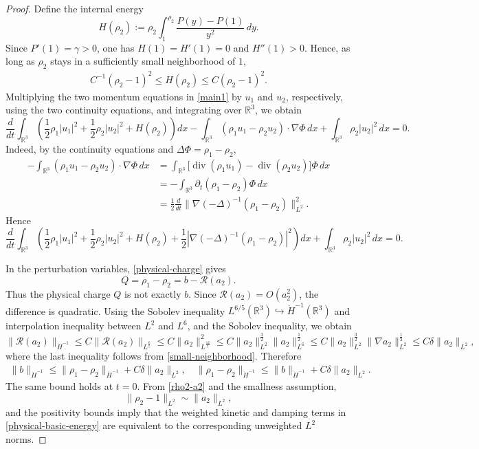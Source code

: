 \documentclass[10pt,reqno]{amsart}
\numberwithin{equation}{section}
\begin{document}
\begin{proof}
 Define the internal energy
\[%
H(\rho_2):=\rho_2\int_1^{\rho_2}\frac{P(y)-P(1)}{y^2}\,dy.
\]%
Since $P'(1)=\gamma>0$, one has $H(1)=H'(1)=0$ and $H''(1)>0$.  Hence, as long as $\rho_2$ stays in a sufficiently small neighborhood of $1$,
\begin{align}\label{H-equivalence}
C^{-1}(\rho_2-1)^2\le H(\rho_2)\le C(\rho_2-1)^2.
\end{align}
Multiplying the two momentum equations in \eqref{main1} by $u_1$ and $u_2$, respectively, using the two continuity equations, and integrating over $\mathbb R^3$, we obtain
\[
 \frac{d}{dt}\int_{\mathbb R^3}
\left(\frac12\rho_1|u_1|^2+\frac12\rho_2|u_2|^2+H(\rho_2)\right)dx -\int_{\mathbb R^3}(\rho_1u_1-\rho_2u_2)\cdot\nabla\Phi\,dx
+\int_{\mathbb R^3}\rho_2|u_2|^2\,dx=0.
\]
 Indeed, by the continuity equations and
$\Delta\Phi=\rho_1-\rho_2$,
\begin{align*}
-\int_{\mathbb R^3}(\rho_1u_1-\rho_2u_2)\cdot\nabla\Phi\,dx
&=\int_{\mathbb R^3}\big[\operatorname{div}(\rho_1u_1)-\operatorname{div}(\rho_2u_2)\big]\Phi\,dx\\
&=-\int_{\mathbb R^3}\partial_t(\rho_1-\rho_2)\Phi\,dx\\
&=\frac12\frac{d}{dt}
\|\nabla(-\Delta)^{-1}(\rho_1-\rho_2)\|_{L^2}^2.
\end{align*}
Hence
\begin{equation}\label{physical-basic-energy}
 \frac{d}{dt}\int_{\mathbb R^3}\left(
\frac12\rho_1|u_1|^2+\frac12\rho_2|u_2|^2+H(\rho_2)
+\frac12|\nabla(-\Delta)^{-1}(\rho_1-\rho_2)|^2\right)dx +\int_{\mathbb R^3}\rho_2|u_2|^2\,dx=0.
\end{equation}

In the perturbation variables, \eqref{physical-charge} gives
\[
Q=\rho_1-\rho_2=b-\mathcal R(a_2).
\]
Thus the physical charge $Q$ is not exactly $b$.  Since $\mathcal R(a_2)=O(a_2^2)$, the difference is quadratic.  Using the Sobolev inequality
$L^{6/5}(\mathbb R^3)\hookrightarrow\dot H^{-1}(\mathbb R^3)$ and interpolation inequality between $L^2$ and $L^6$, and the Sobolev
inequality, we obtain
\[ 
\|\mathcal R(a_2)\|_{\dot H^{-1}}
\le C\|\mathcal R(a_2)\|_{L^{\frac{6}{5}}} \le C\|a_2\|_{L^{\frac{12}{5}}}^2 \le C\|a_2\|_{L^2}^{\frac{3}{2}}\|a_2\|_{L^6}^{\frac{1}{2}}
\le C\|a_2\|_{L^2}^{\frac{3}{2}}\|\nabla a_2\|_{L^2}^{\frac{1}{2}}
\le C\delta\|a_2\|_{L^2},
\] 
where the last inequality follows from \eqref{small-neighborhood}.  Therefore
\begin{align}\label{charge-b-equivalence}
\|b\|_{\dot H^{-1}}
 \le \|\rho_1-\rho_2\|_{\dot H^{-1}}+C\delta\|a_2\|_{L^2},\quad \|\rho_1-\rho_2\|_{\dot H^{-1}} \le \|b\|_{\dot H^{-1}}+C\delta\|a_2\|_{L^2}.
\end{align}
The same bound holds at $t=0$.  From \eqref{rho2-a2} and the smallness assumption,
\[
\|\rho_2-1\|_{L^2}\sim\|a_2\|_{L^2},
\]
and the positivity bounds imply that the weighted kinetic and damping terms in
\eqref{physical-basic-energy} are equivalent to the corresponding unweighted $L^2$ norms.


\end{proof}
\end{document}
